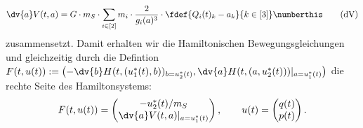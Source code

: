 \documentclass{subfiles}
\begin{document}
    \[
        \dv{a}V(t,a) = G\cdot m_S\cdot\sum_{i\in[2]}m_i\cdot\frac{2}{g_i(a)^3}\cdot\fdef{Q_i(t)_k - a_k}{k\in[3]}\numberthis\label{eq:dV}\tag{dV}
    \]
    zusammensetzt. Damit erhalten wir die Hamiltonischen Bewegungsgleichungen und gleichzeitig durch die Defintion $F(t,u(t)):=\bigl(-\dv{b}H(t,(u_1^*(t),b))_{b=u_2^*(t)},\dv{a}H(t,(a,u_2^*(t)))|_{a=u_1^*(t)}\bigr)$ die rechte Seite des Hamiltonsystems:
    \begin{align*}
        F(t,u(t)) = \begin{pmatrix}
            -u_2^*(t)/m_S\\
            \dv{a}V(t,a)|_{a=u_1^* (t)}
        \end{pmatrix}, \qquad u(t) = \begin{pmatrix}
            q(t)\\
            p(t)
        \end{pmatrix}.
    \end{align*}
\end{document}
